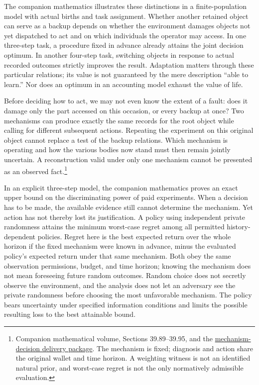 \documentclass[
  english,
  11pt,
  oneside]{book}
\begin{document}
The companion mathematics illustrates these distinctions in a finite-population model with actual births and task assignment. Whether another retained object can serve as a backup depends on whether the environment damages objects not yet dispatched to act and on which individuals the operator may access. In one three-step task, a procedure fixed in advance already attains the joint decision optimum. In another four-step task, switching objects in response to actual recorded outcomes strictly improves the result. Adaptation matters through these particular relations; its value is not guaranteed by the mere description ``able to learn.'' Nor does an optimum in an accounting model exhaust the value of life.

Before deciding how to act, we may not even know the extent of a fault: does it damage only the part accessed on this occasion, or every backup at once? Two mechanisms can produce exactly the same records for the root object while calling for different subsequent actions. Repeating the experiment on this original object cannot replace a test of the backup relations. Which mechanism is operating and how the various bodies now stand must then remain jointly uncertain. A reconstruction valid under only one mechanism cannot be presented as an observed fact.\footnote{\hypertarget{ph-note-27}{}Companion mathematical volume, Sections 39.89--39.95, and the \href{https://github.com/MurphyHoops/UEOT/blob/3d443ec29eb17af1fc00699a74e2d42d73516d81/formalization/ueot-core/docs/compression/theory_completion/unified_closure/mechanism_decision_closure_v1/README.md}{mechanism-decision delivery package}. The mechanism is fixed; diagnosis and action share the original wallet and time horizon. A weighting witness is not an identified natural prior, and worst-case regret is not the only normatively admissible evaluation.}

In an explicit three-step model, the companion mathematics proves an exact upper bound on the discriminating power of paid experiments. When a decision has to be made, the available evidence still cannot determine the mechanism. Yet action has not thereby lost its justification. A policy using independent private randomness attains the minimum worst-case regret among all permitted history-dependent policies. Regret here is the best expected return over the whole horizon if the fixed mechanism were known in advance, minus the evaluated policy's expected return under that same mechanism. Both obey the same observation permissions, budget, and time horizon; knowing the mechanism does not mean foreseeing future random outcomes. Random choice does not secretly observe the environment, and the analysis does not let an adversary see the private randomness before choosing the most unfavorable mechanism. The policy bears uncertainty under specified information conditions and limits the possible resulting loss to the best attainable bound.
\end{document}

